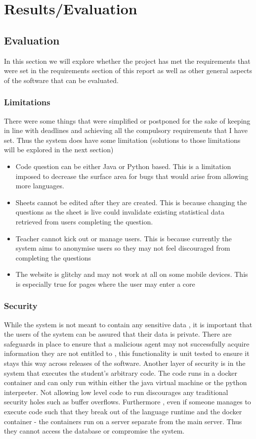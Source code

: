 \chapter{Results/Evaluation}

\section{Evaluation}
In this section we will explore whether the project has met the requirements that were set in the requirements section of this report as well as other general aspects of the software that can be evaluated.

\subsection{Limitations}
There were some things that were simplified or postponed for the sake of keeping in line with deadlines and achieving all the compulsory requirements that I have set. Thus the system does have some limitation (solutions to those limitations will be explored in the next section)

\begin{itemize}
	\item Code question can be either Java or Python based. This is a limitation imposed to decrease the surface area for bugs that would arise from allowing more languages.
	\item Sheets cannot be edited after they are created. This is because changing the questions as the sheet is live could invalidate existing statistical data retrieved from users completing the question.
	\item Teacher cannot kick out or manage users. This is because currently the system aims to anonymise users so they may not feel discouraged from completing the questions
	\item The website is glitchy and may not work at all on some mobile devices. This is especially true for pages where the user may enter a core
\end{itemize}

\subsection{Security}
While the system is not meant to contain any sensitive data , it is important that the users of the system can be assured that their data is private. 
There are safeguards in place to ensure that a malicious agent may not successfully acquire information they are not entitled to , this functionality is unit tested to ensure it stays this way across releases of the software.
Another layer of security is in the system that executes the student's arbitrary code.
The code runs in a docker container and can only run within either the java virtual machine or the python interpreter. Not allowing low level code to run discourages any traditional security holes such as buffer overflows.
Furthermore , even if someone manages to execute code such that they break out of the language runtime and the docker container - the containers run on a server separate from the main server. Thus they cannot access the database or compromise the system.

